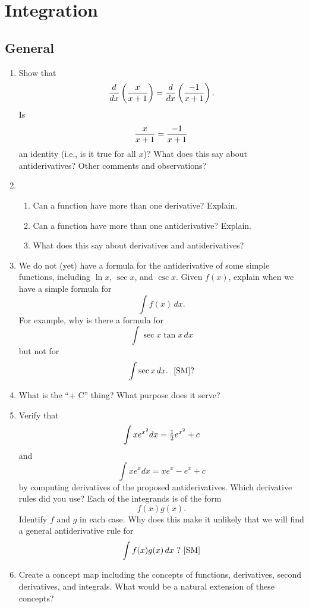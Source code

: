 \chapter{Integration}\section{General}\begin{enumerate} 


\item Show that $${d \over {dx}}\left( {{x \over {x + 1}}} \right) = {d \over {dx}}\left( {{{ - 1} \over {x + 1}}} \right).$$  Is $${x \over {x + 1}} = {{ - 1} \over {x + 1}}$$ an identity (i.e., is it true for all $x$)?  What does this say about antiderivatives?  Other comments and observations?  \cite{FWG}

\item \begin{enumerate} 

\item   	Can a function have more than one derivative? Explain.


\item   Can a function have more than one antiderivative?  Explain.


\item   What does this say about derivatives and antiderivatives?\end{enumerate}

\item   We do not (yet) have a formula for the antiderivative of some simple functions, including $\ln x$, $\sec x$, and $\csc x$.  Given $f(x)$, explain when we have a simple formula for $$\int {f(x)\,} dx.$$  For example, why is there a formula for $$\int {\sec x\tan x\,dx} $$ but not for $$\int {\sec x\,dx}.\ \ \cite{SM} ?$$  

\item   What is the ``+ C'' thing?  What purpose does it serve?  

\item   Verify that $$\int {xe^{x^2 } dx}  = {\textstyle{1 \over 2}}e^{x^2 }  + c$$ and $$\int {xe^x dx}  = xe^x  - e^x  + c$$ by computing derivatives of the proposed antiderivatives.  Which derivative rules did you use?  Each of the integrands is of the form $$f(x)g(x).$$  Identify $f$ and $g$ in each case.  Why does this make it unlikely that we will find a general antiderivative rule for $$\int {f(x)g(x)\,} dx\ ? \  \cite{SM}$$

\item   Create a concept map including the concepts of functions, derivatives, second derivatives, and integrals.  What would be a natural extension of these concepts?


\end{enumerate}
